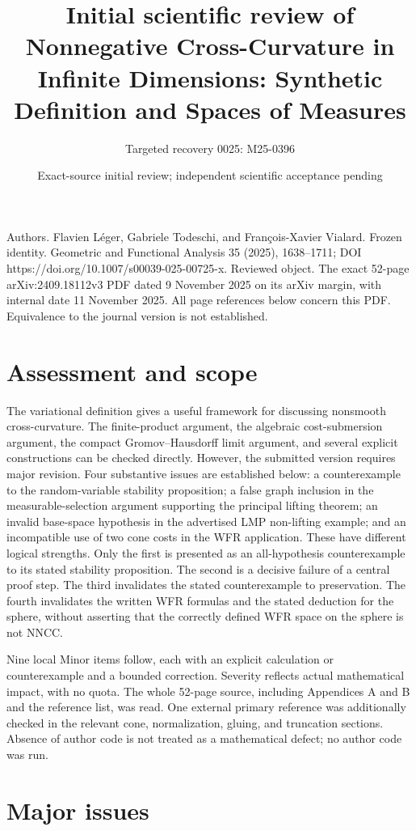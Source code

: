 \documentclass[10pt]{article}
\title{Initial scientific review of
Nonnegative Cross-Curvature in Infinite Dimensions:
Synthetic Definition and Spaces of Measures}
\author{Targeted recovery 0025: M25-0396}
\date{Exact-source initial review; independent scientific acceptance pending}
\begin{document}
\maketitle
Authors. Flavien Léger, Gabriele Todeschi, and François-Xavier Vialard. Frozen identity. Geometric and Functional Analysis 35 (2025), 1638–1711; DOI https://doi.org/10.1007/s00039-025-00725-x. Reviewed object. The exact 52-page arXiv:2409.18112v3 PDF dated 9 November 2025 on its arXiv margin, with internal date 11 November 2025. All page references below concern this PDF. Equivalence to the journal version is not established.\par
\section*{Assessment and scope}
The variational definition gives a useful framework for discussing nonsmooth cross-curvature. The finite-product argument, the algebraic cost-submersion argument, the compact Gromov–Hausdorff limit argument, and several explicit constructions can be checked directly. However, the submitted version requires major revision. Four substantive issues are established below: a counterexample to the random-variable stability proposition; a false graph inclusion in the measurable-selection argument supporting the principal lifting theorem; an invalid base-space hypothesis in the advertised LMP non-lifting example; and an incompatible use of two cone costs in the WFR application. These have different logical strengths. Only the first is presented as an all-hypothesis counterexample to its stated stability proposition. The second is a decisive failure of a central proof step. The third invalidates the stated counterexample to preservation. The fourth invalidates the written WFR formulas and the stated deduction for the sphere, without asserting that the correctly defined WFR space on the sphere is not NNCC.\par
Nine local Minor items follow, each with an explicit calculation or counterexample and a bounded correction. Severity reflects actual mathematical impact, with no quota. The whole 52-page source, including Appendices A and B and the reference list, was read. One external primary reference was additionally checked in the relevant cone, normalization, gluing, and truncation sections. Absence of author code is not treated as a mathematical defect; no author code was run.\par
\section*{Major issues}
\end{document}
